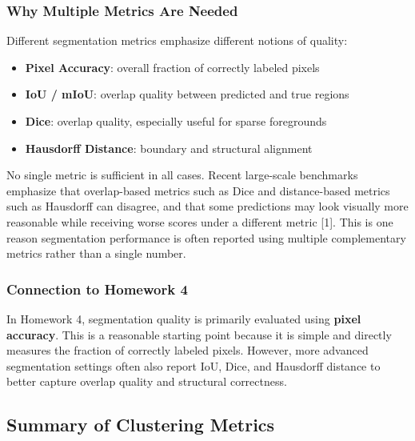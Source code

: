 \documentclass{article}
\renewcommand{\cite}[1]{[#1]}
\begin{document}
\subsubsection{Why Multiple Metrics Are Needed}

Different segmentation metrics emphasize different notions of quality:

\begin{itemize}
    \item \textbf{Pixel Accuracy}: overall fraction of correctly labeled pixels
    \item \textbf{IoU / mIoU}: overlap quality between predicted and true regions
    \item \textbf{Dice}: overlap quality, especially useful for sparse foregrounds
    \item \textbf{Hausdorff Distance}: boundary and structural alignment
\end{itemize}

No single metric is sufficient in all cases. Recent large-scale benchmarks emphasize that overlap-based metrics such as Dice and distance-based metrics such as Hausdorff can disagree, and that some predictions may look visually more reasonable while receiving worse scores under a different metric \cite{1}. This is one reason segmentation performance is often reported using multiple complementary metrics rather than a single number. 

\subsubsection{Connection to Homework 4}

In Homework 4, segmentation quality is primarily evaluated using \textbf{pixel accuracy}. This is a reasonable starting point because it is simple and directly measures the fraction of correctly labeled pixels. However, more advanced segmentation settings often also report IoU, Dice, and Hausdorff distance to better capture overlap quality and structural correctness.

\subsection{Summary of Clustering Metrics}
\end{document}
